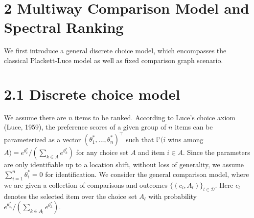 \section{2 Multiway Comparison Model and Spectral Ranking}\label{multiway-comparison-model-and-spectral-ranking}

We first introduce a general discrete choice model, which encompasses the classical Plackett-Luce model as well as fixed comparison graph scenario.

\section{2.1 Discrete choice model}\label{discrete-choice-model}

We assume there are \(n\) items to be ranked. According to Luce's choice axiom (Luce, 1959), the preference scores of a given group of \(n\) items can be parameterized as a vector \((\theta_{1}^{*}, \ldots , \theta_{n}^{*})^{\top}\) such that \(\mathbb{P}(i\) wins among \(A) = e^{\theta_{i}^{*}} / (\sum_{k \in A} e^{\theta_{k}^{*}})\) for any choice set \(A\) and item \(i \in A\). Since the parameters are only identifiable up to a location shift, without loss of generality, we assume \(\sum_{i = 1}^{n} \theta_{i}^{*} = 0\) for identification. We consider the general comparison model, where we are given a collection of comparisons and outcomes \(\{(c_{l}, A_{l})\}_{l \in \mathcal{D}}\). Here \(c_{l}\) denotes the selected item over the choice set \(A_{l}\) with probability \(e^{\theta_{c_{l}}^{*}} / (\sum_{k \in A_{l}} e^{\theta_{k}^{*}})\).

